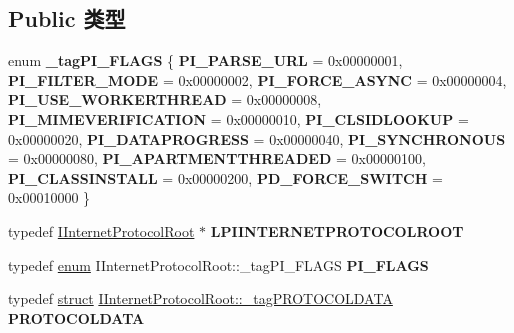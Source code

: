 \subsection*{Public 类型}
\begin{DoxyCompactItemize}
\item 
\mbox{\label{interface_i_internet_protocol_root_abed8853aa5b0904b811eda90b0307eab}} 
enum {\bfseries \+\_\+tag\+P\+I\+\_\+\+F\+L\+A\+GS} \{ \newline
{\bfseries P\+I\+\_\+\+P\+A\+R\+S\+E\+\_\+\+U\+RL} = 0x00000001, 
{\bfseries P\+I\+\_\+\+F\+I\+L\+T\+E\+R\+\_\+\+M\+O\+DE} = 0x00000002, 
{\bfseries P\+I\+\_\+\+F\+O\+R\+C\+E\+\_\+\+A\+S\+Y\+NC} = 0x00000004, 
{\bfseries P\+I\+\_\+\+U\+S\+E\+\_\+\+W\+O\+R\+K\+E\+R\+T\+H\+R\+E\+AD} = 0x00000008, 
\newline
{\bfseries P\+I\+\_\+\+M\+I\+M\+E\+V\+E\+R\+I\+F\+I\+C\+A\+T\+I\+ON} = 0x00000010, 
{\bfseries P\+I\+\_\+\+C\+L\+S\+I\+D\+L\+O\+O\+K\+UP} = 0x00000020, 
{\bfseries P\+I\+\_\+\+D\+A\+T\+A\+P\+R\+O\+G\+R\+E\+SS} = 0x00000040, 
{\bfseries P\+I\+\_\+\+S\+Y\+N\+C\+H\+R\+O\+N\+O\+US} = 0x00000080, 
\newline
{\bfseries P\+I\+\_\+\+A\+P\+A\+R\+T\+M\+E\+N\+T\+T\+H\+R\+E\+A\+D\+ED} = 0x00000100, 
{\bfseries P\+I\+\_\+\+C\+L\+A\+S\+S\+I\+N\+S\+T\+A\+LL} = 0x00000200, 
{\bfseries P\+D\+\_\+\+F\+O\+R\+C\+E\+\_\+\+S\+W\+I\+T\+CH} = 0x00010000
 \}
\item 
\mbox{\label{interface_i_internet_protocol_root_a812ce01e0822e9412153f9c7b6946a34}} 
typedef \hyperlink{interface_i_internet_protocol_root}{I\+Internet\+Protocol\+Root} $\ast$ {\bfseries L\+P\+I\+I\+N\+T\+E\+R\+N\+E\+T\+P\+R\+O\+T\+O\+C\+O\+L\+R\+O\+OT}
\item 
\mbox{\label{interface_i_internet_protocol_root_a112bf0979f869936b4cb250892de4abb}} 
typedef \hyperlink{interfaceenum}{enum} I\+Internet\+Protocol\+Root\+::\+\_\+tag\+P\+I\+\_\+\+F\+L\+A\+GS {\bfseries P\+I\+\_\+\+F\+L\+A\+GS}
\item 
\mbox{\label{interface_i_internet_protocol_root_a3381be1fbcdf05b1e36bbe45982879fb}} 
typedef \hyperlink{interfacestruct}{struct} \hyperlink{struct_i_internet_protocol_root_1_1__tag_p_r_o_t_o_c_o_l_d_a_t_a}{I\+Internet\+Protocol\+Root\+::\+\_\+tag\+P\+R\+O\+T\+O\+C\+O\+L\+D\+A\+TA} {\bfseries P\+R\+O\+T\+O\+C\+O\+L\+D\+A\+TA}
\end{DoxyCompactItemize}
